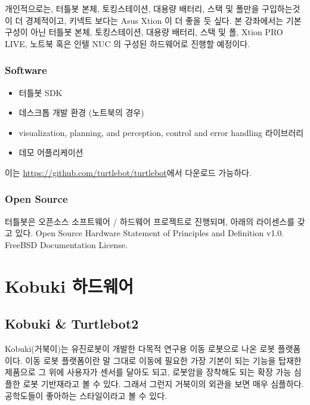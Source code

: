 \noindent
개인적으로는, 터틀봇 본체, 토킹스테이션, 대용량 배터리, 스택 및 폴만을 구입하는것이 더 경제적이고, 키넥트 보다는 Asus Xtion 이 더 좋을 듯 싶다. 본 강좌에서는 기본 구성이 아닌 터틀봇 본체, 토킹스테이션, 대용량 배터리, 스택 및 폴, Xtion PRO LIVE, 노트북 혹은 인텔 NUC 의 구성된 하드웨어로 진행할 예정이다.

\subsubsection{Software}

\begin{itemize}[leftmargin=*]
\item 터틀봇 SDK
\item 데스크톱 개발 환경 (노트북의 경우)
\item visualization, planning, and perception, control and error handling 라이브러리
\item 데모 어플리케이션
\end{itemize}

이는 \url{https://github.com/turtlebot/turtlebot}에서 다운로드 가능하다.


\subsubsection{Open Source}
터틀봇은 오픈소스 소프트웨어 / 하드웨어 프로젝트로 진행되며, 아래의 라이센스를 갖고 있다.
Open Source Hardware Statement of Principles and Definition v1.0. 
FreeBSD Documentation License.

\section{Kobuki 하드웨어}

\subsection{Kobuki \& Turtlebot2}

Kobuki(거북이)는 유진로봇이 개발한 다목적 연구용 이동 로봇으로 나온 로봇 플랫폼이다. 이동 로봇 플랫폼이란 말 그대로 이동에 필요한 가장 기본이 되는 기능을 탑재한 제품으로 그 위에 사용자가 센서를 달아도 되고, 로봇암을 장착해도 되는 확장 가능 심플한 로봇 기반재라고 볼 수 있다. 그래서 그런지 거북이의 외관을 보면 매우 심플하다. 공학도들이 좋아하는 스타일이라고 볼 수 있다. 

